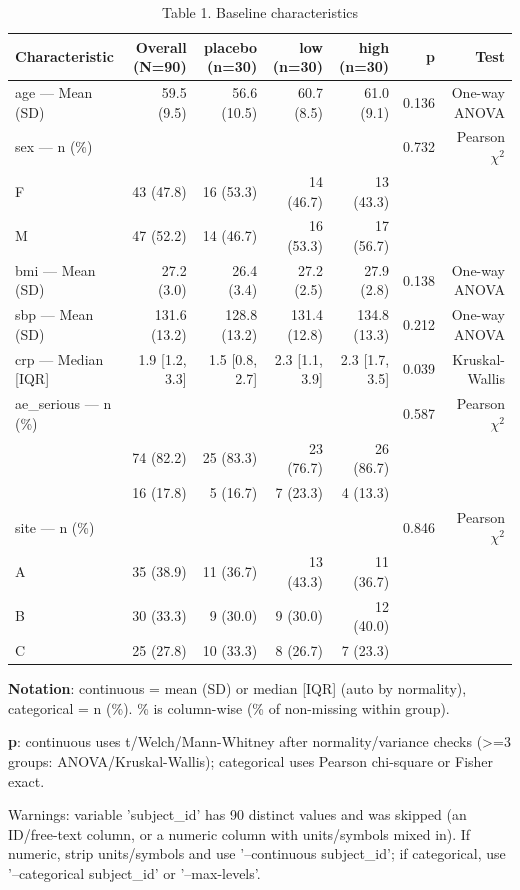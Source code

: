 \begin{table}[htbp]
  \centering
  \caption{Table 1. Baseline characteristics}
  \begin{tabular}{lrrrrrr}
  \toprule
  Characteristic & Overall (N=90) & placebo (n=30) & low (n=30) & high (n=30) & p & Test \\
  \midrule
  age --- Mean (SD) & 59.5 (9.5) & 56.6 (10.5) & 60.7 (8.5) & 61.0 (9.1) & 0.136 & One-way ANOVA \\
  sex --- n (\%) &  &  &  &  & 0.732 & Pearson $\chi^2$ \\
  \quad F & 43 (47.8) & 16 (53.3) & 14 (46.7) & 13 (43.3) &  &  \\
  \quad M & 47 (52.2) & 14 (46.7) & 16 (53.3) & 17 (56.7) &  &  \\
  bmi --- Mean (SD) & 27.2 (3.0) & 26.4 (3.4) & 27.2 (2.5) & 27.9 (2.8) & 0.138 & One-way ANOVA \\
  sbp --- Mean (SD) & 131.6 (13.2) & 128.8 (13.2) & 131.4 (12.8) & 134.8 (13.3) & 0.212 & One-way ANOVA \\
  crp --- Median [IQR] & 1.9 [1.2, 3.3] & 1.5 [0.8, 2.7] & 2.3 [1.1, 3.9] & 2.3 [1.7, 3.5] & 0.039 & Kruskal-Wallis \\
  ae\_serious --- n (\%) &  &  &  &  & 0.587 & Pearson $\chi^2$ \\
  \quad 0 & 74 (82.2) & 25 (83.3) & 23 (76.7) & 26 (86.7) &  &  \\
  \quad 1 & 16 (17.8) & 5 (16.7) & 7 (23.3) & 4 (13.3) &  &  \\
  site --- n (\%) &  &  &  &  & 0.846 & Pearson $\chi^2$ \\
  \quad A & 35 (38.9) & 11 (36.7) & 13 (43.3) & 11 (36.7) &  &  \\
  \quad B & 30 (33.3) & 9 (30.0) & 9 (30.0) & 12 (40.0) &  &  \\
  \quad C & 25 (27.8) & 10 (33.3) & 8 (26.7) & 7 (23.3) &  &  \\
  \bottomrule
  \end{tabular}
  \begin{minipage}{\linewidth}\footnotesize
  \textbf{Notation}: continuous = mean (SD) or median [IQR] (auto by normality), categorical = n (\%). \% is column-wise (\% of non-missing within group). \par
  \textbf{p}: continuous uses t/Welch/Mann-Whitney after normality/variance checks (\textgreater{}=3 groups: ANOVA/Kruskal-Wallis); categorical uses Pearson chi-square or Fisher exact. \par
  Warnings: variable 'subject\_id' has 90 distinct values and was skipped (an ID/free-text column, or a numeric column with units/symbols mixed in). If numeric, strip units/symbols and use '--continuous subject\_id'; if categorical, use '--categorical subject\_id' or '--max-levels'. \par
  \end{minipage}
\end{table}
